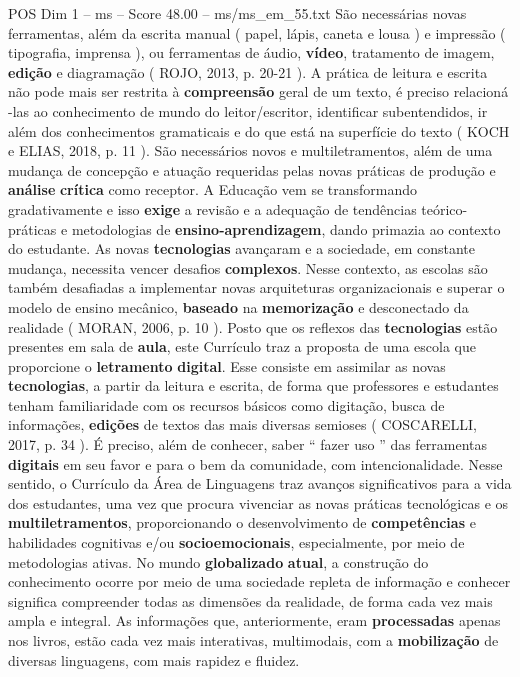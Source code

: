 \begin{textsample}{POS Dim 1 – ms – Score 48.00 – ms/ms\_em\_55.txt}
São necessárias novas ferramentas, além da escrita manual ( papel, lápis, caneta e lousa ) e impressão ( tipografia, imprensa ), ou ferramentas de áudio, \textbf{vídeo}, tratamento de imagem, \textbf{edição} e diagramação ( ROJO, 2013, p. 20-21 ).
A prática de leitura e escrita não pode mais ser restrita à \textbf{compreensão} geral de um texto, é preciso relacioná -las ao conhecimento de mundo do leitor/escritor, identificar subentendidos, ir além dos conhecimentos gramaticais e do que está na superfície do texto ( KOCH e ELIAS, 2018, p. 11 ).
São necessários novos e multiletramentos, além de uma mudança de concepção e atuação requeridas pelas novas práticas de produção e \textbf{análise} \textbf{crítica} como receptor.
A Educação vem se transformando gradativamente e isso \textbf{exige} a revisão e a adequação de tendências teórico-práticas e metodologias de \textbf{ensino-aprendizagem}, dando primazia ao contexto do estudante.
As novas \textbf{tecnologias} avançaram e a sociedade, em constante mudança, necessita vencer desafios \textbf{complexos}.
Nesse contexto, as escolas são também desafiadas a implementar novas arquiteturas organizacionais e superar o modelo de ensino mecânico, \textbf{baseado} na \textbf{memorização} e desconectado da realidade ( MORAN, 2006, p. 10 ).
Posto que os reflexos das \textbf{tecnologias} estão presentes em sala de \textbf{aula}, este Currículo traz a proposta de uma escola que proporcione o \textbf{letramento} \textbf{digital}.
Esse consiste em assimilar as novas \textbf{tecnologias}, a partir da leitura e escrita, de forma que professores e estudantes tenham familiaridade com os recursos básicos como digitação, busca de informações, \textbf{edições} de textos das mais diversas semioses ( COSCARELLI, 2017, p. 34 ).
É preciso, além de conhecer, saber “ fazer uso ” das ferramentas \textbf{digitais} em seu favor e para o bem da comunidade, com intencionalidade.
Nesse sentido, o Currículo da Área de Linguagens traz avanços significativos para a vida dos estudantes, uma vez que procura vivenciar as novas práticas tecnológicas e os \textbf{multiletramentos}, proporcionando o desenvolvimento de \textbf{competências} e habilidades cognitivas e/ou \textbf{socioemocionais}, especialmente, por meio de metodologias ativas.
No mundo \textbf{globalizado} \textbf{atual}, a construção do conhecimento ocorre por meio de uma sociedade repleta de informação e conhecer significa compreender todas as dimensões da realidade, de forma cada vez mais ampla e integral.
As informações que, anteriormente, eram \textbf{processadas} apenas nos livros, estão cada vez mais interativas, multimodais, com a \textbf{mobilização} de diversas linguagens, com mais rapidez e fluidez.

\end{textsample}
